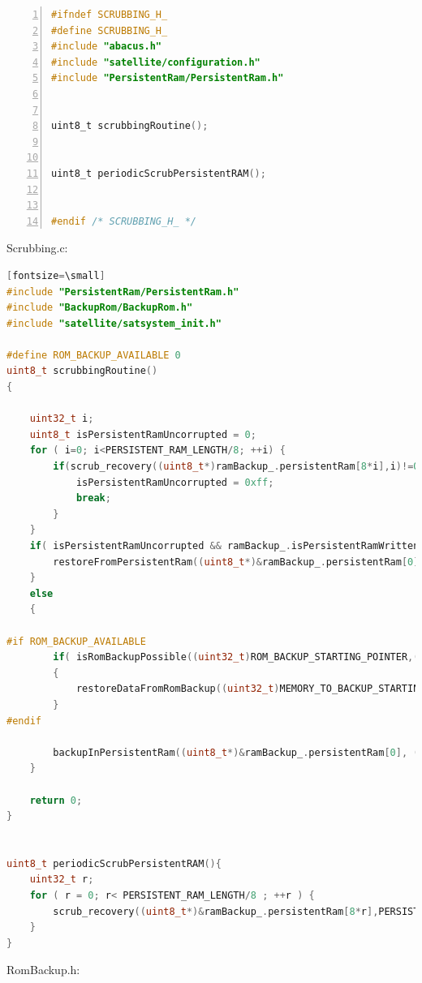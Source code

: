 \documentclass[LaM,binding=0.6cm,oneside]{../sapthesis}
\begin{document}
\begin{lstlisting}[language=C,
                   basicstyle=\scriptsize,
                   numbers=left,
                   stepnumber=0,
                   numbersep=4pt,
                   tabsize=2,
                   showspaces=false,
                   showstringspaces=false]
#ifndef SCRUBBING_H_
#define SCRUBBING_H_
#include "abacus.h"
#include "satellite/configuration.h"
#include "PersistentRam/PersistentRam.h"


uint8_t scrubbingRoutine();


uint8_t periodicScrubPersistentRAM();


#endif /* SCRUBBING_H_ */
\end{lstlisting}
Scrubbing.c:
\begin{lstlisting}[language=c][fontsize=\small]
#include "PersistentRam/PersistentRam.h"
#include "BackupRom/BackupRom.h"
#include "satellite/satsystem_init.h"

#define ROM_BACKUP_AVAILABLE 0
uint8_t scrubbingRoutine()
{

    uint32_t i;
    uint8_t isPersistentRamUncorrupted = 0;
    for ( i=0; i<PERSISTENT_RAM_LENGTH/8; ++i) {
        if(scrub_recovery((uint8_t*)ramBackup_.persistentRam[8*i],i)!=0x0) {
            isPersistentRamUncorrupted = 0xff;
            break;
        }
    }
    if( isPersistentRamUncorrupted && ramBackup_.isPersistentRamWritten ) {
        restoreFromPersistentRam((uint8_t*)&ramBackup_.persistentRam[0],(uint8_t*)&satelliteStatus_,PERSISTENT_RAM_LENGTH);
    }
    else
    {

#if ROM_BACKUP_AVAILABLE
        if( isRomBackupPossible((uint32_t)ROM_BACKUP_STARTING_POINTER,(uint32_t)PERSISTENT_RAM_BYTE_SIZE) )
        {
            restoreDataFromRomBackup((uint32_t)MEMORY_TO_BACKUP_STARTING_POINTER, (uint32_t)ROM_BACKUP_STARTING_POINTER, (uint32_t)PERSISTENT_RAM_BYTE_SIZE);
        }
#endif

        backupInPersistentRam((uint8_t*)&ramBackup_.persistentRam[0], (uint8_t*)&satelliteStatus_, PERSISTENT_RAM_LENGTH);
    }

    return 0;
}


uint8_t periodicScrubPersistentRAM(){
    uint32_t r;
    for ( r = 0; r< PERSISTENT_RAM_LENGTH/8 ; ++r ) {
        scrub_recovery((uint8_t*)&ramBackup_.persistentRam[8*r],PERSISTENT_RAM_LENGTH/8);
    }
}

\end{lstlisting}
RomBackup.h:
\end{document}
